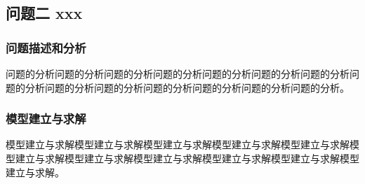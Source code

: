 \subsection{问题二 xxx}
\subsubsection{问题描述和分析}
问题的分析问题的分析问题的分析问题的分析问题的分析问题的分析问题的分析问题的分析问题的分析问题的分析问题的分析问题的分析问题的分析问题的分析。
\subsubsection{模型建立与求解}
模型建立与求解模型建立与求解模型建立与求解模型建立与求解模型建立与求解模型建立与求解模型建立与求解模型建立与求解模型建立与求解模型建立与求解模型建立与求解。
